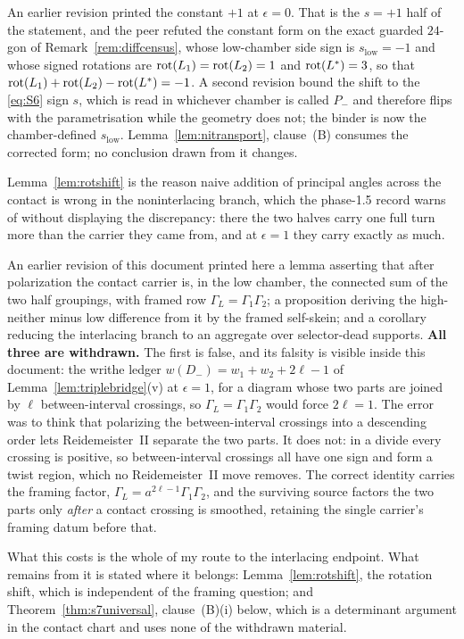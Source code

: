 \begin{remark}\label{rem:rotshiftsign}
An earlier revision printed the constant $+1$ at $\epsilon=0$. That is the
$s=+1$ half of the statement, and the peer refuted the constant form on the
exact guarded $24$-gon of Remark~\ref{rem:diffcensus}, whose low-chamber side
sign is $s_{\mathrm{low}}=-1$
and whose signed rotations are $\operatorname{rot}(L_1)=\operatorname{rot}(L_2)=1$ and $\operatorname{rot}(L^{*})=3$, so
that $\operatorname{rot}(L_1)+\operatorname{rot}(L_2)-\operatorname{rot}(L^{*})=-1$. A second revision bound the shift to the
\eqref{eq:S6} sign $s$, which is read in whichever chamber is called $P_-$ and
therefore flips with the parametrisation while the geometry does not; the
binder is now the chamber-defined
$s_{\mathrm{low}}$. Lemma~\ref{lem:nitransport}, clause~(B) consumes the corrected form; no
conclusion drawn from it changes.
\end{remark}

\begin{remark}\label{rem:missingturn}
Lemma~\ref{lem:rotshift} is the reason naive addition of principal angles
across the contact is wrong in the noninterlacing branch, which the phase-1.5
record warns of without displaying the discrepancy: there the two halves carry
one full turn more than the carrier they came from, and at $\epsilon=1$ they
carry exactly as much.
\end{remark}

\begin{remark}\label{rem:withdrawnbracket}
An earlier revision of this document printed here a lemma asserting that after
polarization the contact carrier is, in the low chamber, the connected sum of
the two half groupings, with framed row $\Gamma_L=\Gamma_1\Gamma_2$; a
proposition deriving the high-neither minus low difference from it by the
framed self-skein; and a corollary reducing the interlacing branch to an
aggregate over selector-dead supports. \textbf{All three are withdrawn.} The first
is false, and its falsity is visible inside this document: the writhe ledger
$w(D_-)=w_1+w_2+2\ell-1$ of Lemma~\ref{lem:triplebridge}(v) at $\epsilon=1$,
for a diagram whose
two parts are joined by $\ell$ between-interval crossings, so
$\Gamma_L=\Gamma_1\Gamma_2$ would force $2\ell=1$. The error was to think that
polarizing the between-interval crossings into a descending order lets
Reidemeister~II separate the two parts. It does not: in a divide every crossing
is positive, so between-interval crossings all have one sign and form a twist
region, which no Reidemeister~II move removes. The correct identity carries the
framing factor, $\Gamma_L=a^{2\ell-1}\Gamma_1\Gamma_2$, and the surviving
source factors the two parts only \emph{after} a contact crossing is smoothed,
retaining the single carrier's framing datum before that.

What this costs is the whole of my route to the interlacing endpoint. What
remains from it is stated where it belongs: Lemma~\ref{lem:rotshift}, the
rotation shift, which is independent of the framing question; and
Theorem~\ref{thm:s7universal}, clause~(B)(i) below, which is a determinant argument in
the contact chart and uses none of the withdrawn material.
\end{remark}

